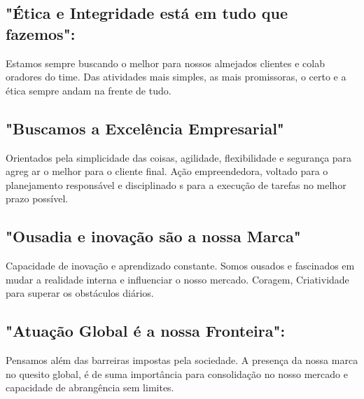                 \begin{description}
                    \subsection{"Ética e Integridade está em tudo que fazemos":} 
                    Estamos sempre buscando o melhor para nossos almejados clientes e colab
                    oradores do time. Das atividades mais simples, as mais promissoras, o certo e a
                    ética sempre andam na frente de tudo.
                    \end{description}

                    \begin{description}
                        \subsection{"Buscamos a Excelência Empresarial"} 
                        Orientados pela simplicidade das coisas, agilidade, flexibilidade e segurança para agreg
                        ar o melhor para o cliente final. Ação empreendedora, voltado para o planejamento responsável e disciplinado
                        s para a execução de tarefas no melhor prazo possível.
                        \end{description}

                        \begin{description}
                            \subsection{"Ousadia e inovação são a nossa Marca"} 
                            Capacidade de inovação e aprendizado constante. Somos ousados e fascinados em mudar a realidade
                            interna e influenciar o nosso mercado. Coragem, Criatividade para superar os obstáculos diários.
                            \end{description}

                            \begin{description}
                                \subsection{"Atuação Global é a nossa Fronteira":} 
                                Pensamos além das barreiras impostas pela sociedade. A presença da nossa marca no quesito global,
                                é de suma importância para consolidação no nosso mercado e capacidade de abrangência sem limites.
                                \end{description}

